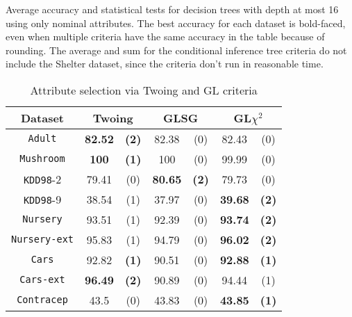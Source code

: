 \begin{table*}
    \caption{Average accuracy and statistical tests  for  decision trees 
with depth at most 16 using only nominal attributes. The best accuracy for each dataset is bold-faced, even when multiple criteria have the same accuracy in the table because of rounding.
The average and sum for the conditional inference tree criteria do not include the Shelter dataset, since the criteria don't run in reasonable time.}
\label{tab:CrossVal}
    \begin{subtable}{.6\linewidth}
      \centering
        \caption{Attribute selection via Twoing and GL criteria}
        

\begin{tabular}{c|cc|cc|cc} 
Dataset             & \multicolumn{2}{c|}{Twoing} &  \multicolumn{2}{c|}{GLSG}  &   \multicolumn{2}{c}{GL$\chi^2$}  \\ \hline
{\tt Adult}         &  {\bf 82.52} & {\bf (2)}    &  82.38       &  (0)         &  82.43       & (0)                \\
{\tt Mushroom}      &  {\bf 100}   & {\bf (1)}    &  100         &  (0)         &  99.99       & (0)                \\
{\tt KDD98}-2       &  79.41       & (0)          &  {\bf 80.65} & {\bf (2)}    &  79.73       & (0)                \\
{\tt KDD98}-9       &  38.54       & (1)          &  37.97       & (0)          &  {\bf 39.68} & {\bf (2)}          \\
{\tt Nursery}       &  93.51       & (1)          &  92.39       & (0)          &  {\bf 93.74} & {\bf (2)}          \\
{\tt Nursery-ext}   &  95.83       & (1)          &  94.79       & (0)          &  {\bf 96.02} & {\bf (2)}          \\
{\tt Cars}          &  92.82       & {\bf (1)}    &  90.51       & (0)          &  {\bf 92.88} & {\bf (1)}          \\
{\tt Cars-ext}      &  {\bf 96.49} & {\bf (2)}    &  90.89       & (0)          &  94.44       & (1)                \\
{\tt Contracep}     &  43.5        & (0)          &  43.83       & (0)          &  {\bf 43.85} & {\bf (1)}          \\

\end{tabular}
\end{subtable}
\end{table*}
